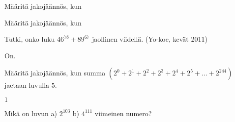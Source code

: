 \begin{kotitehtavasivu}

\begin{tehtava}
	Määritä jakojäännös, kun
	\begin{alakohdat}
	\end{alakohdat}
  \begin{vastaus}
    \begin{alakohdat}
    \end{alakohdat}
  \end{vastaus}
\end{tehtava}

\begin{tehtava}
	Määritä jakojäännös, kun
	\begin{alakohdat}
	\end{alakohdat}
  \begin{vastaus}
    \begin{alakohdat}
    \end{alakohdat}
  \end{vastaus}
\end{tehtava}

\begin{tehtava}
	Tutki, onko luku $46^{78} + 89^{67}$ jaollinen viidellä. (Yo-koe, kevät 2011)
  \begin{vastaus}
    On.
  \end{vastaus}
\end{tehtava}

\begin{tehtava}
	Määritä jakojäännös, kun summa $(2^0 + 2^1 + 2^2 + 2^3 + 2^4 + 2^5 + \ldots + 2^{244})$ jaetaan luvulla $5$.
  \begin{vastaus}
    $1$
  \end{vastaus}
\end{tehtava}

\begin{tehtava}
	Mikä on luvun a) $2^{103}$  b) $4^{111}$ viimeinen numero?
  \begin{vastaus}
    \begin{alakohdat}
    \end{alakohdat}
  \end{vastaus}
\end{tehtava}


\end{kotitehtavasivu}
